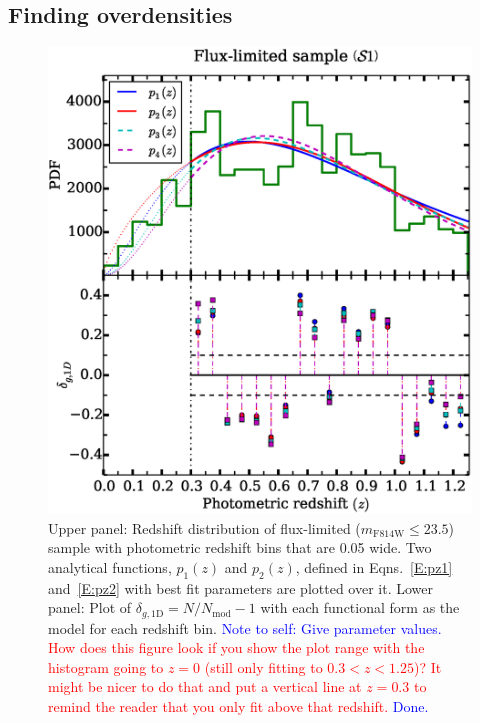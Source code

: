 \documentclass[twocolumn,useAMS,usenatbib]{mn2e}
\newcommand{\rachel}[1]{{\textcolor{red}{#1}}}
\newcommand{\arun}[1]{{\textcolor{blue}{#1}}}
\begin{document}
\subsection{Finding overdensities}
\label{sub:overdensities}
\begin{figure}
 \centering
  \includegraphics[width=\columnwidth]{redshift_fluxlimited}
  \caption{Upper panel: Redshift distribution of flux-limited
    ($m_\text{F814W}\le 23.5$) sample with photometric redshift bins
    that are 0.05 wide. Two analytical functions, $p_1(z)$ and $p_2(z)$, defined in Eqns.~\ref{E:pz1} and~\ref{E:pz2} with best fit
    parameters are plotted over it. 
           Lower panel: Plot of $\delta_{g,\text{1D}} =
           N/N_{\text{mod}}-1$ with each functional form as the model
           for each redshift bin. \arun{Note to self: Give parameter values.}
\rachel{How does this figure look if you show the plot range with the
  histogram going to $z=0$ (still only fitting to $0.3<z<1.25$)?  It
  might be nicer to do that and put a vertical line at $z=0.3$ to
  remind the reader that you only fit above that redshift.} \arun{Done.}
}
  \label{fig:redshift_fluxlimited}
\end{figure}
\end{document}
